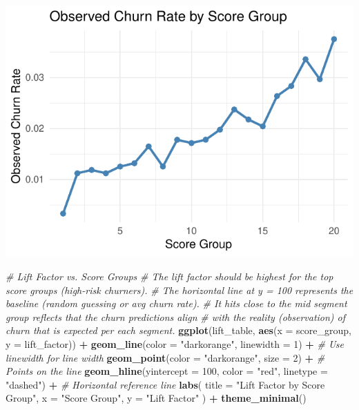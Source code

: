 \documentclass[
]{article}
\newenvironment{Shaded}{\begin{snugshade}}{\end{snugshade}}
\newcommand{\AttributeTok}[1]{\textcolor[rgb]{0.13,0.29,0.53}{#1}}
\newcommand{\CommentTok}[1]{\textcolor[rgb]{0.56,0.35,0.01}{\textit{#1}}}
\newcommand{\DecValTok}[1]{\textcolor[rgb]{0.00,0.00,0.81}{#1}}
\newcommand{\FunctionTok}[1]{\textcolor[rgb]{0.13,0.29,0.53}{\textbf{#1}}}
\newcommand{\NormalTok}[1]{#1}
\newcommand{\SpecialCharTok}[1]{\textcolor[rgb]{0.81,0.36,0.00}{\textbf{#1}}}
\newcommand{\StringTok}[1]{\textcolor[rgb]{0.31,0.60,0.02}{#1}}
\begin{document}
\begin{flushright}\includegraphics{p7_files/figure-latex/unnamed-chunk-14-1} \end{flushright}

\begin{Shaded}
\begin{Highlighting}[]
\CommentTok{\# Lift Factor vs. Score Groups}
\CommentTok{\# The lift factor should be highest for the top score groups (high{-}risk churners).}
\CommentTok{\# The horizontal line at y = 100 represents the baseline (random guessing or avg churn rate). }
\CommentTok{\# It hits close to the mid segment group reflects that the churn predictions align }
\CommentTok{\# with the reality (observation) of churn that is expected per each segment.}
\FunctionTok{ggplot}\NormalTok{(lift\_table, }\FunctionTok{aes}\NormalTok{(}\AttributeTok{x =}\NormalTok{ score\_group, }\AttributeTok{y =}\NormalTok{ lift\_factor)) }\SpecialCharTok{+}
  \FunctionTok{geom\_line}\NormalTok{(}\AttributeTok{color =} \StringTok{"darkorange"}\NormalTok{, }\AttributeTok{linewidth =} \DecValTok{1}\NormalTok{) }\SpecialCharTok{+}  \CommentTok{\# Use \textasciigrave{}linewidth\textasciigrave{} for line width}
  \FunctionTok{geom\_point}\NormalTok{(}\AttributeTok{color =} \StringTok{"darkorange"}\NormalTok{, }\AttributeTok{size =} \DecValTok{2}\NormalTok{) }\SpecialCharTok{+}  \CommentTok{\# Points on the line}
  \FunctionTok{geom\_hline}\NormalTok{(}\AttributeTok{yintercept =} \DecValTok{100}\NormalTok{, }\AttributeTok{color =} \StringTok{"red"}\NormalTok{, }\AttributeTok{linetype =} \StringTok{"dashed"}\NormalTok{) }\SpecialCharTok{+}  \CommentTok{\# Horizontal reference line}
  \FunctionTok{labs}\NormalTok{(}
    \AttributeTok{title =} \StringTok{"Lift Factor by Score Group"}\NormalTok{,}
    \AttributeTok{x =} \StringTok{"Score Group"}\NormalTok{,}
    \AttributeTok{y =} \StringTok{"Lift Factor"}
\NormalTok{  ) }\SpecialCharTok{+}
  \FunctionTok{theme\_minimal}\NormalTok{()}
\end{Highlighting}
\end{Shaded}
\end{document}
